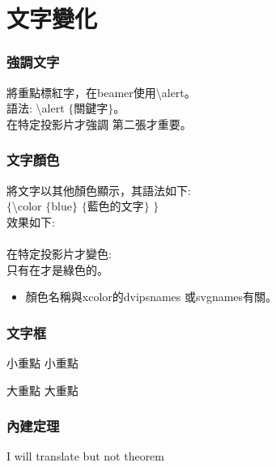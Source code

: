 \documentclass[xcolor=svgnames]{beamer}
\begin{document}
\section{文字變化}
\begin{frame}
\frametitle{強調文字} %
將重點標紅字，在beamer使用\alert{\textbackslash alert}。\\ 
語法:
\textbackslash alert $\lbrace$關鍵字$\rbrace$。\\ 
在特定投影片才強調  
\alert<2>{第二張}才重要。  
\end{frame}
\begin{frame}
\frametitle{文字顏色} %
將文字以其他顏色顯示，其語法如下:\\
$\lbrace$\textbackslash color $\lbrace$blue$\rbrace$ $\lbrace$藍色的文字$\rbrace$ $\rbrace$\\
效果如下:\\
{\color{blue}{藍色的文字}}\\[10pt]
在特定投影片才變色:\\
只有在{}才是綠色的。\\
\begin{itemize}
\item 顏色名稱與xcolor的dvipsnames 或svgnames有關。
\end{itemize}
\end{frame}
\begin{frame}
\frametitle{文字框} %
\begin{block}{小重點}
小重點
\end{block}

\begin{alertblock}{大重點}
大重點
\end{alertblock}
\end{frame}
\begin{frame}
\frametitle{內建定理}
\begin{theorem}
I will translate  but not theorem
\end{theorem}
\end{frame}
\end{document}
